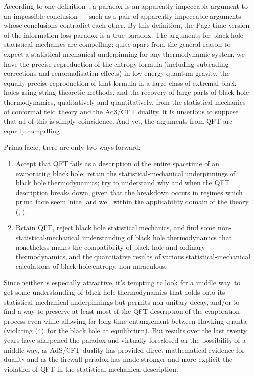 \documentclass[12pt]{article}
\begin{document}
According to one definition~\cite[ch.1]{quineparadox}, a paradox is an apparently-impeccable argument to an impossible conclusion --- such as a pair of apparently-impeccable arguments whose conclusions contradict each other. By this definition, the Page time version of the information-loss paradox is a true paradox. The arguments for black hole statistical mechanics are compelling: quite apart from the general reason to expect a statistical-mechanical underpinning for any thermodynamic system, we have the precise reproduction of the entropy formula (including subleading corrections and renormalisation effects) in low-energy quantum gravity, the equally-precise reproduction of that formula in a large class of extremal black holes using string-theoretic methods, and the recovery of large parts of black hole thermodynamics, qualitatively and quantitatively, from the statistical mechanics of conformal field theory and the AdS/CFT duality. It is unserious to suppose that all of this is simply coincidence. And yet, the arguments from QFT are equally compelling.

Prima facie, there are only two ways forward:
\begin{enumerate}
\item Accept that QFT fails as a description of the entire spacetime of an evaporating black hole; retain the statistical-mechanical underpinnings of black hole thermodynamics; try to understand why and when the QFT description breaks down, given that the breakdown occurs in regimes which prima facie seem `nice' and well within the applicability domain of the theory (, ).
\item Retain QFT, reject black hole statistical mechanics, and find some non-statistical-mechanical understanding of black hole thermodynamics that nonetheless makes the compatibility of black hole and ordinary thermodynamics, and the quantitative results of various statistical-mechanical calculations of black hole entropy, non-miraculous.
\end{enumerate}
Since neither is especially attractive, it's tempting to look for a middle way: to get some understanding of black-hole thermodynamics that holds onto its statistical-mechanical underpinnings but permits non-unitary decay, and/or to find a way to preserve at least most of the QFT description of the evaporation process even while allowing for long-time entanglement between Hawking quanta (violating (4), for the black hole at equilibrium). But results over the last twenty years have sharpened the paradox and virtually foreclosed on the possibility of a middle way, as AdS/CFT duality has provided direct mathematical evidence for duality and as the firewall paradox has made stronger and more explicit the violation of QFT in the statistical-mechanical description.
\end{document}
